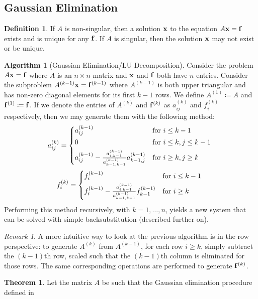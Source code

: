\documentclass[11pt,letterpaper]{article}
\numberwithin{figure}{section} %
\newcommand{\keyword}[1]{\colorbox{cyan!20!}{#1}}
\theoremstyle{definition}
\newtheorem{theorem}{Theorem}[subsection]
\theoremstyle{definition}
\theoremstyle{definition}
\newtheorem{definition}{Definition}[subsection]
\theoremstyle{definition}
\theoremstyle{remark}
\newtheorem*{remark}{Remark}
\theoremstyle{remark}
\theoremstyle{definition}
\newtheorem*{algorithm}{Algorithm}
\theoremstyle{remark}
\theoremstyle{remark}
\begin{document}
\begin{multicols*}{3}
\subsection{Gaussian Elimination}
\begin{definition}
	If $A$ is \keyword{non-singular}, then a solution $\vb{x}$ to the equation
	$A\vb{x} = \vb{f}$ exists and is unique for any $\vb{f}$. If $A$ is
	\keyword{singular}, then the solution $\vb{x}$ may not exist or be unique.
\end{definition}
\begin{algorithm}[Gaussian Elimination/LU Decomposition]\label{alg:GE}
	Consider the problem $A\vb{x} = \vb{f}$ where $A$ is an $n \times n$ matrix
	and $\vb{x}$ and $\vb{f}$ both have $n$ entries. Consider the subproblem
	$A^{(k-1)}\vb{x} = \vb{f}^{(k-1)}$ where $A^{(k-1)}$ is both upper triangular and has
	non-zero diagonal elements for its first $k-1$ rows. We define $A^{(1)} \coloneqq
	A$ and $\vb{f}^{(1)} \coloneqq \vb{f}$. If we denote the entries of
	$A^{(k)}$ and $\vb{f}^{(k)}$ as $a_{ij}^{(k)}$ and $f_i^{(k)}$ respectively,
	then we may generate them with the following method:
	\[
		a_{ij}^{(k)} = 
		\begin{cases*}
			a_{ij}^{(k-1)} & for $i \leq k - 1$ \\
			0 & for $i \leq k, j \leq k -1$ \\
			a_{ij}^{(k-1)} - \frac{a_{i, k-1}^{(k-1)}}{a_{k-1, k-1}^{(k-1)}} a_{k-1,j}^{(k-1)} & for $i \geq k, j \geq k$
		\end{cases*}
	\]
	\[
		f_i^{(k)} = 
		\begin{cases*}
			f_i^{(k-1)} & for $i \leq k-1$ \\
			f_i^{(k-1)} - \frac{a_{i, k-1}^{(k-1)}}{a_{k-1, k-1}^{(k-1)}} f_{k-1}^{(k-1)} & for $i \geq k$
		\end{cases*}
	\]
	Performing this method recursively, with $k=1,\ldots, n$, yields a new system
	that can be solved with simple backsubstitution (described further on). 
\end{algorithm}
\begin{remark}
	A more intuitive way to look at the previous algorithm is in the row
	perspective: to generate $A^{(k)}$ from $A^{(k-1)}$, for each row $i \geq k$,
	simply subtract the $(k-1)$th row, scaled such that the $(k-1)$th column is
	eliminated for those rows. The same corresponding operations are performed
	to generate $\vb{f}^{(k)}$.
\end{remark}
\begin{theorem}
	Let the matrix $A$ be such that the Gaussian elimination procedure defined in

\end{theorem}
\end{multicols*}
\end{document}
